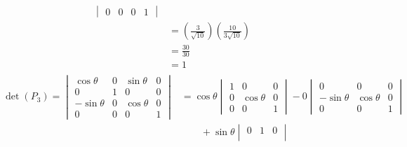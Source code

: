 \documentclass[11pt]{article}
\begin{document}
\begin{enumerate}[label=\textbf{\arabic*.}]
{\begin{enumerate}[label=\textbf{(\alph*)}]
{\begin{align*}
\begin{vmatrix}
                            0                   & 0                     & 0 & 1
                        \end{vmatrix}                                                                      \\
                                                  & =\left(\frac{3}{\sqrt{10}}\right)\left(\frac{10}{3\sqrt{10}}\right) \\
                                                  & =\frac{30}{30}                                                      \\
                                                  & =1
                    \end{align*}
                    \begin{align*}
                        \begin{split}
                            \det(P_3)=
                            \begin{vmatrix}
                                \cos\theta  & 0 & \sin\theta & 0 \\
                                0           & 1 & 0          & 0 \\
                                -\sin\theta & 0 & \cos\theta & 0 \\
                                0           & 0 & 0          & 1
                            \end{vmatrix}
                            & =
                            \cos\theta\begin{vmatrix}
                                1 & 0          & 0 \\
                                0 & \cos\theta & 0 \\
                                0 & 0          & 1
                            \end{vmatrix}
                            -
                            0\begin{vmatrix}
                                0           & 0          & 0 \\
                                -\sin\theta & \cos\theta & 0 \\
                                0           & 0          & 1
                            \end{vmatrix} \\
                            &\qquad+
                            \sin\theta\begin{vmatrix}
                                0           & 1 & 0 \\

\end{vmatrix}
\end{split}
\end{align*}}
\end{enumerate}}
\end{enumerate}
\end{document}

